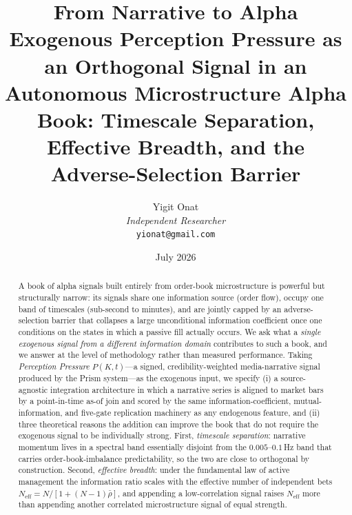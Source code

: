 \documentclass[11pt,a4paper]{article}
\theoremstyle{definition}
\theoremstyle{plain}
\begin{document}
\title{\textbf{From Narrative to Alpha}\\[4pt]
\large Exogenous Perception Pressure as an Orthogonal Signal in an\\
Autonomous Microstructure Alpha Book: Timescale Separation,\\
Effective Breadth, and the Adverse-Selection Barrier}

\author{Yigit Onat\\
\textit{Independent Researcher}\\
\texttt{yionat@gmail.com}}
\date{July 2026}
\maketitle

\begin{abstract}
A book of alpha signals built entirely from order-book microstructure is powerful but structurally
narrow: its signals share one information source (order flow), occupy one band of timescales
(sub-second to minutes), and are jointly capped by an adverse-selection barrier that collapses a
large unconditional information coefficient once one conditions on the states in which a passive fill
actually occurs. We ask what a \emph{single exogenous signal from a different information domain}
contributes to such a book, and we answer at the level of methodology rather than measured
performance. Taking \emph{Perception Pressure} $P(K,t)$---a signed, credibility-weighted media-narrative
signal produced by the Prism system---as the exogenous input, we specify (i) a source-agnostic
integration architecture in which a narrative series is aligned to market bars by a point-in-time
as-of join and scored by the same information-coefficient, mutual-information, and five-gate
replication machinery as any endogenous feature, and (ii) three theoretical reasons the addition can
improve the book that do not require the exogenous signal to be individually strong. First,
\emph{timescale separation}: narrative momentum lives in a spectral band essentially disjoint from the
$0.005$--$0.1$\,Hz band that carries order-book-imbalance predictability, so the two are close to
orthogonal by construction. Second, \emph{effective breadth}: under the fundamental law of active
management the information ratio scales with the effective number of independent bets
$N_{\mathrm{eff}}=N/[1+(N-1)\bar\rho]$, and appending a low-correlation signal raises
$N_{\mathrm{eff}}$ more than appending another correlated microstructure signal of equal strength.

\end{abstract}
\end{document}
